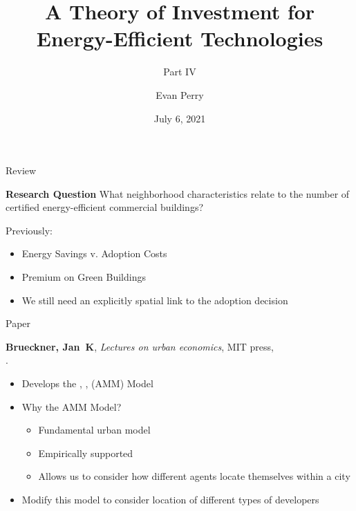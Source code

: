 \documentclass[11pt]{beamer}
\title{A Theory of Investment for\\ Energy-Efficient Technologies}
\subtitle{Part IV}
\author{Evan Perry}
\institute{Spellman Program}
\date{July 6, 2021}
\begin{document}
\maketitlepage

\begin{frame}{Review}

\begin{exampleblock}{\large\textbf{Research Question}}
What neighborhood characteristics relate to the number of certified energy-efficient commercial buildings?
\end{exampleblock}

\vfill
Previously:
\begin{itemize}
	\item Energy Savings v. Adoption Costs
	\item Premium on Green Buildings
	\item We still need an explicitly spatial link to the adoption decision
\end{itemize}
\end{frame}

\begin{frame}{Paper}

%

{\bf Brueckner, Jan~K}, {\it Lectures on urban economics}, MIT press,\\
.

\vfill
\begin{itemize}
	\item Develops the \cite{alonso2013location}, \cite{muth1969cities}, \cite{mills1967aggregative} (AMM) Model
	
	\vfill
	\item Why the AMM Model?
	\begin{itemize}
		\item Fundamental urban model
		\item Empirically supported
		\item Allows us to consider how different agents locate themselves within a city
	\end{itemize}
	\vfill
	
	\item Modify this model to consider location of different types of developers
\end{itemize}

\end{frame}
\end{document}
